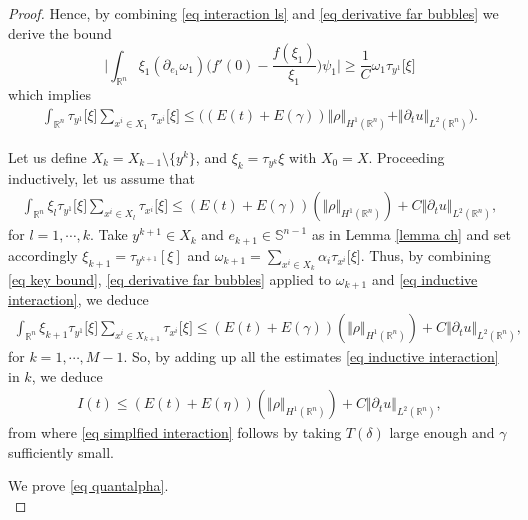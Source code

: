 \documentclass[11pt,letterpaper,reqno]{amsart}
\newcommand{\R}{\mathbb{R}}
\theoremstyle{plain}%
\theoremstyle{definition}
\numberwithin{equation}{section}
\numberwithin{figure}{section}
\begin{document}
\begin{proof}
 Hence, by combining \eqref{eq interaction ls} and \eqref{eq derivative far bubbles} we derive the bound
 \begin{equation}\label{eq bad centers iso}
 	\Big| \int_{\R^n} \xi_1 (\partial_{e_1}  \omega_1 )\Big( f'(0) -\frac{f(\xi_1)}{\xi_1}\Big)  \psi_1\Big| \geq \frac{1}{C }\omega_1 \tau_{y^1}\big[\xi \big]
 \end{equation}
which implies
\begin{eqnarray}\label{eq small ball}
	\int_{\R^n}   \tau_{y^1}\big[\xi \big] \sum_{x^i \in X_1}  \tau_{x^i}\big[\xi \big]  \leq \Big((E(t)+E(\gamma))\Vert \rho\Vert_{H^1(\R^n)} +\Vert \partial_t u\Vert_{L^2(\R^n)}\Big).
\end{eqnarray}

Let us define $X_k = X_{k-1} \setminus \{y^k\}$, and $\xi_k = \tau_{y^k} \xi$ with $X_0=X$. Proceeding inductively, let us assume that
\begin{eqnarray}\label{eq inductive interaction}
	\int_{\R^n} \xi_{l} \tau_{y^1}\big[\xi \big] \sum_{x^i \in X_l}  \tau_{x^i}\big[\xi \big] \leq (E(t)+E(\gamma))(\Vert \rho\Vert_{H^1(\R^n)})+C\Vert \partial_t u\Vert_{L^2(\R^n)},
\end{eqnarray}
for $l=1,\cdots, k$. Take $y^{k+1}  \in X_k$ and $e_{k+1} \in \mathbb{S}^{n-1}$ as in Lemma \ref{lemma ch} and set accordingly $\xi_{k+1} = \tau_{y^{k+1}}[\xi]$  and $\omega_{k+1}= \sum_{x^i \in X_{k}} \alpha_i\tau_{x^i}\big[\xi\big]$. Thus, by combining \eqref{eq key bound}, \eqref{eq derivative far bubbles} applied to $\omega_{k+1}$ and \eqref{eq inductive interaction}, we deduce  
\begin{eqnarray}\label{eq inductive interaction}
	\int_{\R^n} \xi_{k+1}\tau_{y^1}\big[\xi \big] \sum_{x^i \in X_{k+1}}  \tau_{x^i}\big[\xi \big] \leq (E(t)+E(\gamma))(\Vert \rho\Vert_{H^1(\R^n)})+C\Vert \partial_t u\Vert_{L^2(\R^n)},
\end{eqnarray}
for $k=1,\cdots, M-1$. So, by adding up all the estimates \eqref{eq inductive interaction} in $k$, we deduce 
\begin{eqnarray*}
I(t) \leq (E(t)+E(\eta))(\Vert \rho\Vert_{H^1(\R^n)})+C\Vert \partial_t u\Vert_{L^2(\R^n)},
	\end{eqnarray*}
from where \eqref{eq simplfied interaction}  follows by taking $T(\delta)$ large enough and $\gamma$ sufficiently small.

\medskip

 We prove \eqref{eq quantalpha}.\\


\end{proof}
\end{document}
